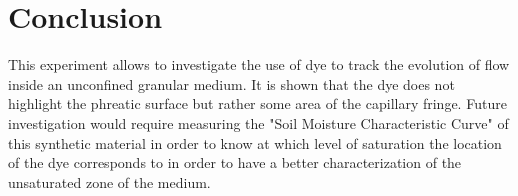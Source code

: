 \documentclass[
10pt, %
letterpaper, %
twoside, %
headinclude,footinclude, %
]{scrartcl}
\begin{document}
\FloatBarrier
\section{Conclusion}

This experiment allows to investigate the use of dye to track the evolution of flow inside an unconfined granular medium. It is shown that the dye does not highlight the phreatic surface but rather some area of the capillary fringe. Future investigation would require measuring the "Soil Moisture Characteristic Curve" of this synthetic material in order to know at which level of saturation the location of the dye corresponds to in order to have a better characterization of the unsaturated zone of the medium.

\clearpage
\printbibliography
\end{document}
